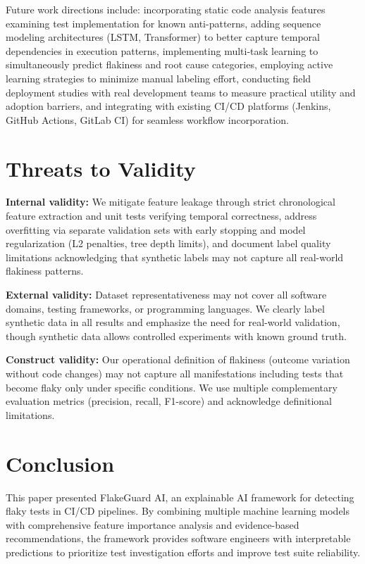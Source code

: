 \documentclass[conference]{IEEEtran}
\begin{document}
Future work directions include: incorporating static code analysis features examining test implementation for known anti-patterns, adding sequence modeling architectures (LSTM, Transformer) to better capture temporal dependencies in execution patterns, implementing multi-task learning to simultaneously predict flakiness and root cause categories, employing active learning strategies to minimize manual labeling effort, conducting field deployment studies with real development teams to measure practical utility and adoption barriers, and integrating with existing CI/CD platforms (Jenkins, GitHub Actions, GitLab CI) for seamless workflow incorporation.

\section{Threats to Validity}
\textbf{Internal validity:} We mitigate feature leakage through strict chronological feature extraction and unit tests verifying temporal correctness, address overfitting via separate validation sets with early stopping and model regularization (L2 penalties, tree depth limits), and document label quality limitations acknowledging that synthetic labels may not capture all real-world flakiness patterns.

\textbf{External validity:} Dataset representativeness may not cover all software domains, testing frameworks, or programming languages. We clearly label synthetic data in all results and emphasize the need for real-world validation, though synthetic data allows controlled experiments with known ground truth.

\textbf{Construct validity:} Our operational definition of flakiness (outcome variation without code changes) may not capture all manifestations including tests that become flaky only under specific conditions. We use multiple complementary evaluation metrics (precision, recall, F1-score) and acknowledge definitional limitations.

\section{Conclusion}
This paper presented FlakeGuard AI, an explainable AI framework for detecting flaky tests in CI/CD pipelines. By combining multiple machine learning models with comprehensive feature importance analysis and evidence-based recommendations, the framework provides software engineers with interpretable predictions to prioritize test investigation efforts and improve test suite reliability.
\end{document}
